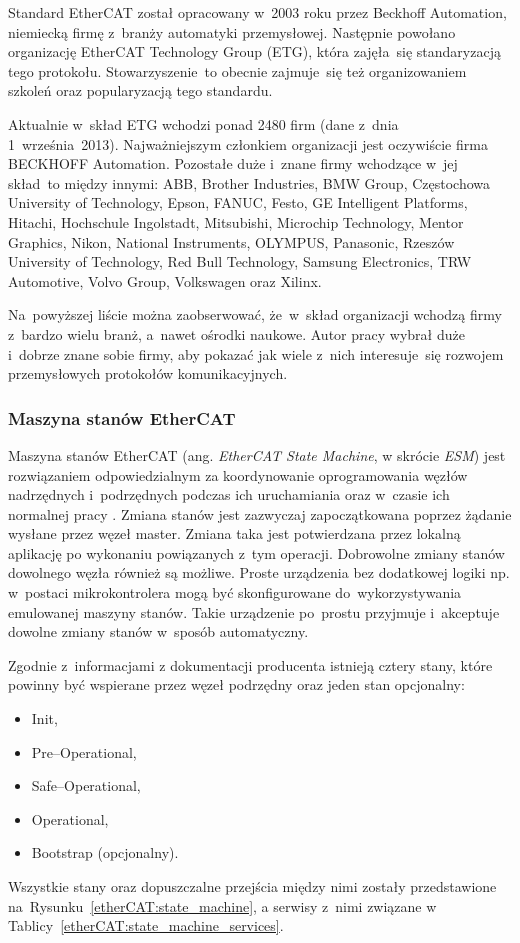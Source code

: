 Standard EtherCAT został opracowany w~2003 roku przez Beckhoff Automation, niemiecką firmę z~branży automatyki przemysłowej. Następnie powołano organizację EtherCAT Technology Group (ETG), która zajęła~się standaryzacją tego protokołu. Stowarzyszenie~to obecnie zajmuje~się też organizowaniem szkoleń oraz popularyzacją tego standardu. 

Aktualnie w~skład ETG wchodzi ponad 2480 firm (dane z~dnia 1~września~2013). Najważniejszym członkiem organizacji jest oczywiście firma BECKHOFF Automation. Pozostałe duże i~znane firmy wchodzące w~jej skład~to między innymi: ABB, Brother Industries, BMW Group, Częstochowa University of Technology, Epson, FANUC, Festo, GE Intelligent Platforms, Hitachi, Hochschule Ingolstadt, Mitsubishi, Microchip Technology, Mentor Graphics, Nikon, National Instruments, OLYMPUS, Panasonic, Rzeszów University of Technology, Red Bull Technology, Samsung Electronics, TRW Automotive, Volvo Group, Volkswagen oraz Xilinx.

Na~powyższej liście można zaobserwować, że~w~skład organizacji wchodzą firmy z~bardzo wielu branż, a~nawet ośrodki naukowe. Autor pracy wybrał duże i~dobrze znane sobie firmy, aby pokazać jak wiele z~nich interesuje~się rozwojem przemysłowych protokołów komunikacyjnych.

\subsubsection{Maszyna stanów EtherCAT}
Maszyna stanów EtherCAT (ang. \textit{EtherCAT State Machine}, w skrócie \textit{ESM}) jest rozwiązaniem odpowiedzialnym za koordynowanie oprogramowania węzłów nadrzędnych i~podrzędnych podczas ich uruchamiania oraz w~czasie ich normalnej pracy \cite{FPGA_Xilinx}.
Zmiana stanów jest zazwyczaj zapoczątkowana poprzez żądanie wysłane przez węzeł master. Zmiana taka jest potwierdzana przez lokalną aplikację po wykonaniu powiązanych z~tym operacji. Dobrowolne zmiany stanów dowolnego węzła również są możliwe.
Proste urządzenia bez dodatkowej logiki np. w~postaci mikrokontrolera mogą być skonfigurowane do~wykorzystywania emulowanej maszyny stanów. Takie urządzenie po~prostu przyjmuje i~akceptuje dowolne zmiany stanów w~sposób automatyczny.

Zgodnie z~informacjami z dokumentacji producenta istnieją cztery stany, które powinny być wspierane przez węzeł podrzędny oraz jeden stan opcjonalny:
\begin{itemize}
\item Init,
\item Pre--Operational,
\item Safe--Operational,
\item Operational,
\item Bootstrap (opcjonalny).
\end{itemize}
Wszystkie stany oraz dopuszczalne przejścia między nimi zostały przedstawione na~Rysunku~\ref{etherCAT:state_machine}, a serwisy z~nimi związane w Tablicy~\ref{etherCAT:state_machine_services}.

